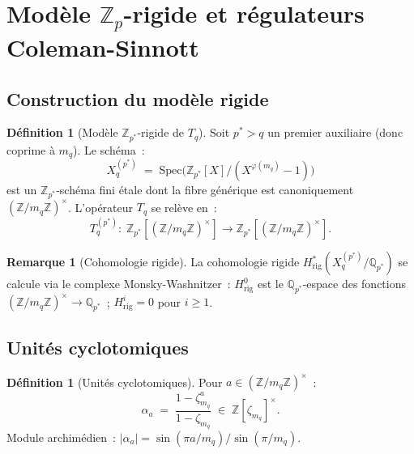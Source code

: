 \documentclass[11pt,a4paper]{article}
\theoremstyle{definition}
\newtheorem{definition}[theorem]{Définition}
\newtheorem{remark}[theorem]{Remarque}
\newcommand{\Z}{\mathbb{Z}}
\newcommand{\Q}{\mathbb{Q}}
\newcommand{\Spec}{\mathrm{Spec}}
\newcommand{\rig}{\mathrm{rig}}
\begin{document}
\section{Modèle \texorpdfstring{$\Z_p$}{Zp}-rigide et régulateurs Coleman-Sinnott}
\label{sec:padic}

\subsection{Construction du modèle rigide}

\begin{definition}[Modèle $\Z_{p^*}$-rigide de $T_q$]
\label{def:zp_model}
Soit $p^* > q$ un premier auxiliaire (donc coprime à $m_q$).
Le schéma~:
\begin{equation}
  X_q^{(p^*)} \;=\; \Spec\!\big(\Z_{p^*}[X]/(X^{\varphi(m_q)}-1)\big)
\end{equation}
est un $\Z_{p^*}$-schéma fini étale dont la fibre générique est
canoniquement $(\Z/m_q\Z)^\times$. L'opérateur $T_q$ se relève en~:
\begin{equation}
  T_q^{(p^*)}: \;
  \Z_{p^*}[(\Z/m_q\Z)^\times] \to \Z_{p^*}[(\Z/m_q\Z)^\times].
\end{equation}
\end{definition}

\begin{remark}[Cohomologie rigide]
La cohomologie rigide $H^*_{\rig}(X_q^{(p^*)}/\Q_{p^*})$ se calcule
via le complexe Monsky-Washnitzer~: $H^0_{\rig}$ est le
$\Q_{p^*}$-espace des fonctions $(\Z/m_q\Z)^\times \to \Q_{p^*}$~;
$H^i_{\rig} = 0$ pour $i\geq 1$.
\end{remark}

\subsection{Unités cyclotomiques}

\begin{definition}[Unités cyclotomiques]
\label{def:cyc_units}
Pour $a\in (\Z/m_q\Z)^\times$~:
\begin{equation}
  \alpha_a \;=\; \frac{1-\zeta_{m_q}^a}{1-\zeta_{m_q}}
  \;\in\; \Z[\zeta_{m_q}]^\times.
\end{equation}
Module archimédien~: $|\alpha_a| = \sin(\pi a/m_q)/\sin(\pi/m_q)$.
\end{definition}
\end{document}
